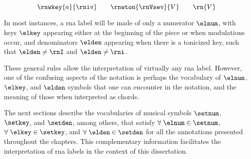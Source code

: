 \begin{equation}
    \label{eq:rn_three_annotations}
    \rnwkey{a}{\rniv} \qquad \rnwton{\rnVsev}{V} \qquad \rn{V}
\end{equation}


In most instances, a \gls{rna} label will be made of only a
numerator $\elnum$, with keys $\elkey$ appearing either at
the beginning of the piece or when modulations occur, and
denominators $\elden$ appearing when there is a tonicized
key, such that $\elden \neq \rnI$ and $\elden \neq \rni$.

These general rules allow the interpretation of virtually
any \gls{rna} label. However, one of the confusing aspects
of the notation is perhaps the vocabulary of $\elnum$,
$\elkey$, and $\elden$ symbols that one can encounter in the
notation, and the meaning of those when interpreted as
chords.

The next sections describe the vocabularies of musical
symbols $\setnum$, $\setkey$, and $\setden$, among others,
that satisfy $\forall \; \elnum \in \setnum$, $\forall \;
\elkey \in \setkey$, and $\forall \; \elden \in \setden$ for
all the annotations presented throughout the chapters. This
complementary information facilitates the interpretation of
\gls{rna} labels in the context of this dissertation.
